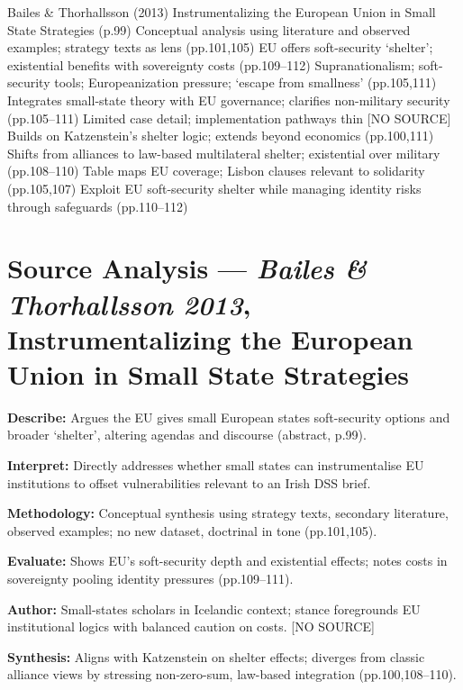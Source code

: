 \parencite{BAILES_2012}


Bailes \& Thorhallsson (2013)	Instrumentalizing the European Union in Small State Strategies (p.99)	Conceptual analysis using literature and observed examples; strategy texts as lens (pp.101,105)	EU offers soft-security ‘shelter’; existential benefits with sovereignty costs (pp.109–112)	Supranationalism; soft-security tools; Europeanization pressure; ‘escape from smallness’ (pp.105,111)	Integrates small-state theory with EU governance; clarifies non-military security (pp.105–111)	Limited case detail; implementation pathways thin [NO SOURCE]	Builds on Katzenstein’s shelter logic; extends beyond economics (pp.100,111)	Shifts from alliances to law-based multilateral shelter; existential over military (pp.108–110)	Table maps EU coverage; Lisbon clauses relevant to solidarity (pp.105,107)	Exploit EU soft-security shelter while managing identity risks through safeguards (pp.110–112)

\section*{Source Analysis — \textit{Bailes \& Thorhallsson 2013}, Instrumentalizing the European Union in Small State Strategies}

\textbf{Describe:} Argues the EU gives small European states soft-security options and broader ‘shelter’, altering agendas and discourse (abstract, p.99). 

\textbf{Interpret:} Directly addresses whether small states can instrumentalise EU institutions to offset vulnerabilities relevant to an Irish DSS brief. 

\textbf{Methodology:} Conceptual synthesis using strategy texts, secondary literature, observed examples; no new dataset, doctrinal in tone (pp.101,105). 

\textbf{Evaluate:} Shows EU’s soft-security depth and existential effects; notes costs in sovereignty pooling identity pressures (pp.109–111).  

\textbf{Author:} Small-states scholars in Icelandic context; stance foregrounds EU institutional logics with balanced caution on costs. [NO SOURCE]

\textbf{Synthesis:} Aligns with Katzenstein on shelter effects; diverges from classic alliance views by stressing non-zero-sum, law-based integration (pp.100,108–110).  

